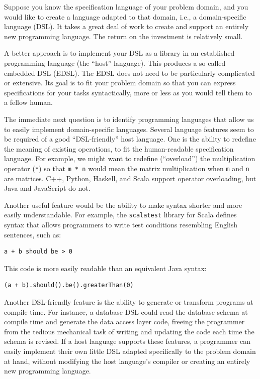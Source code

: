 Suppose you know the specification language of your problem domain,
and you would like to create a language adapted to that domain, i.e.,
a domain-specific language (DSL). It takes a great deal of work to
create and support an entirely new programming language. The return
on the investment is relatively small.

A better approach is to implement your DSL as a library in an established
programming language (the \textsf{``}host\textsf{''} language). This produces a so-called
embedded DSL (EDSL). The EDSL does not need to be particularly complicated
or extensive. Its goal is to fit your problem domain so that you can
express specifications for your tasks syntactically, more or less
as you would tell them to a fellow human.

The immediate next question is to identify programming languages that
allow us to easily implement domain-specific languages. Several language
features seem to be required of a good \textsf{``}DSL-friendly\textsf{''} host language.
One is the ability to redefine the meaning of existing operations,
to fit the human-readable specification language. For example, we
might want to redefine (\textsf{``}overload\textsf{''}) the multiplication operator
(\lstinline!*!) so that \lstinline!m * n! would mean the matrix
multiplication when \lstinline!m! and \lstinline!n! are matrices.
C++, Python, Haskell, and Scala support operator overloading, but
Java and JavaScript do not.

Another useful feature would be the ability to make syntax shorter
and more easily understandable. For example, the \lstinline!scalatest!
library for Scala defines syntax that allows programmers to write
test conditions resembling English sentences, such as:
\begin{lstlisting}
a + b should be > 0
\end{lstlisting}
This code is more easily readable than an equivalent Java syntax:
\begin{lstlisting}
(a + b).should().be().greaterThan(0)
\end{lstlisting}

Another DSL-friendly feature is the ability to generate or transform
programs at compile time. For instance, a database DSL could read
the database schema at compile time and generate the data access layer
code, freeing the programmer from the tedious mechanical task of writing
and updating the code each time the schema is revised. If a host language
supports these features, a programmer can easily implement their own
little DSL adapted specifically to the problem domain at hand, without
modifying the host language\textsf{'}s compiler or creating an entirely new
programming language.

